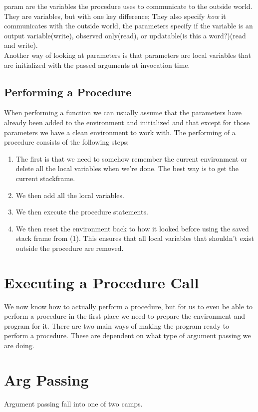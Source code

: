 \gls{param} are the variables the procedure uses to communicate to the outside world. They are variables, but with one key difference;
They also specify \textit{how} it communicates with the outside world, the parameters specify if the variable is an output variable(write), observed only(read), or updatable(is this a word?)(read and write).\\
Another way of looking at parameters is that parameters are local variables that are initialized with the passed arguments at invocation time.
\subsection{Performing a Procedure}
    When performing a function we can usually assume that the parameters have already been added to the environment and initialized and that except for those parameters we have a clean
    environment to work with.
    The performing of a procedure consists of the following steps;
    \begin{enumerate}
        \item The first is that we need to somehow remember the current environment or delete all the local variables when we're done.
            The best way is to get the current \gls{stackframe}.
        \item We then add all the local variables.
        \item We then execute the procedure statements.
        \item We then reset the environment back to how it looked before using the saved stack frame from (1). This ensures that all local variables
            that shouldn't exist outside the procedure are removed. 
    \end{enumerate}
\section{Executing a Procedure Call}
    We now know how to actually perform a procedure, but for us to even be able to perform a procedure in the first place we need to prepare the environment and program for it.
    There are two main ways of making the program ready to perform a procedure. These are dependent on what type of \gls{argument} passing we are doing.
\section{Arg Passing}%
    Argument passing fall into one of two camps.
